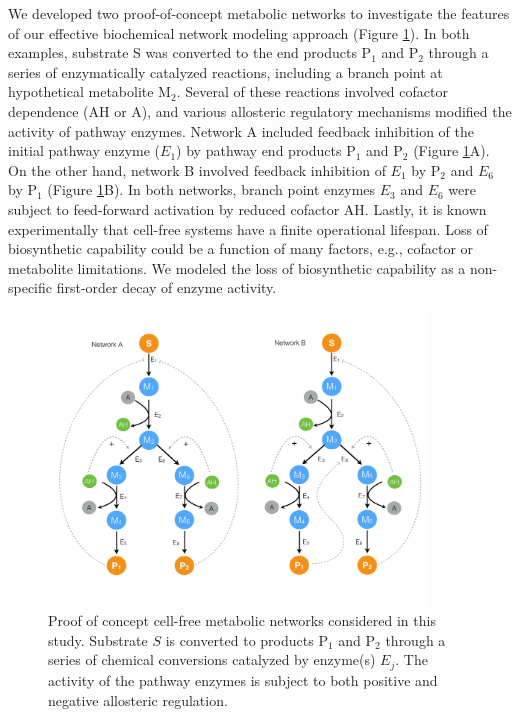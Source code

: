 \documentclass[processes,article,accept,moreauthors,pdftex,12pt,a4paper]{mdpi}
\begin{document}
We developed two proof-of-concept metabolic networks to investigate the features of our effective biochemical network modeling approach (Figure \ref{fig-networks}). 
In both examples, substrate S was converted to the end products P$_{1}$ and P$_{2}$ through a series of enzymatically catalyzed reactions, including a branch point at hypothetical metabolite M$_{2}$. 
Several of these reactions involved cofactor dependence (AH or A), and various allosteric regulatory mechanisms modified the activity of pathway enzymes. 
Network A included feedback inhibition of the initial pathway enzyme ($E_{1}$) by pathway end products P$_{1}$ and P$_{2}$ (Figure \ref{fig-networks}A). 
On the other hand, network B involved feedback inhibition of $E_{1}$ by P$_{2}$ and $E_{6}$ by P$_{1}$ (Figure \ref{fig-networks}B). 
In both networks, branch point enzymes $E_{3}$ and $E_{6}$ were subject to feed-forward activation by reduced cofactor AH. 
Lastly, it is known experimentally that cell-free systems have a finite operational lifespan. 
Loss of biosynthetic capability could be a function of many factors, e.g., cofactor or metabolite limitations. 
We modeled the loss of biosynthetic capability as a non-specific first-order decay of enzyme activity. 

\begin{figure}[H]
\centering
\includegraphics[width=0.9\textwidth]{./figs/Figure-1-Networks.pdf}
\caption{Proof of concept cell-free metabolic networks considered in this study. Substrate $S$ is converted to products P$_{1}$ and P$_{2}$ through a series of chemical conversions
catalyzed by enzyme(s) $E_{j}$. The activity of the pathway enzymes is subject to both positive and negative allosteric regulation. }\label{fig-networks}
\end{figure}
\end{document}
